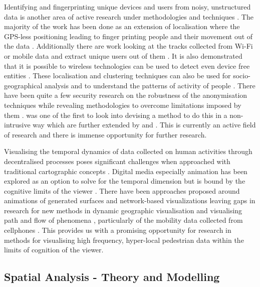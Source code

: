 Identifying and fingerprinting unique devices and users from noisy, unstructured data is another area of active research under methodologies and techniques \citep{jiang2006, liao2006location}.
The majority of the work has been done as an extension of localisation where the GPS-less positioning leading to finger printing people and their movement out of the data \citep{pang2007a, pappalardo2015}.
Additionally there are work looking at the tracks collected from Wi-Fi or mobile data and extract unique users out of them \citep{girardin2008, eagle2009, jiang2012}.
It is also demonstrated that it is possible to wireless technologies can be used to detect even device free entities \citep{elgohary2013}.
These localisation and clustering techniques can also be used for socio-geographical analysis and to understand the patterns of activity of people \citep{licoppe2008}.
There have been quite a few security research on the robustness of the anonymisation techniques while revealing methodologies to overcome limitations imposed by them \citep{mathieuCunche2016, chothia2010, krumm2007}.
\citet{cheng2016can} was one of the first to look into devising a method to do this in a non-intrusive way which are further extended by \citet{di2016mind, adamsky2018wlan} and \citet{dai2019combination}.
This is currently an active field of research and there is immense opportunity for further research.

Visualising the temporal dynamics of data collected on human activities through decentralised processes poses significant challenges when approached with traditional cartographic concepts \citep{maceachren2001, hallisey2005}.
Digital media especially animation has been explored as an option to solve for the temporal dimension \citep{morrison2000, lobben2003} but is bound by the cognitive limits of the viewer \citep{harrower2007}.
There have been approaches proposed around animations of generated surfaces \citep{kobayashi2011} and network-based visualizations \citep{ferrara2014} leaving gaps in research for new methods in dynamic geographic visualisation \citep{fabrikant2005} and visualising path and flow of phenomena \citep{thomas2005}, particularly of the mobility data collected from cellphones \citep{sbodio2014}.
This provides us with a promising opportunity for research in methods for visualising high frequency, hyper-local pedestrian data within the limits of cognition of the viewer.

\subsection{Spatial Analysis - Theory and Modelling}


